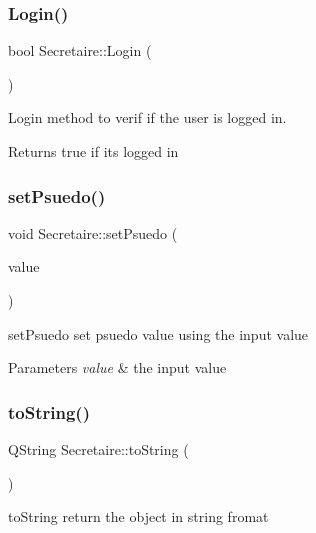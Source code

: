 \subsubsection{\texorpdfstring{Login()}{Login()}}
{\footnotesize\ttfamily bool Secretaire\+::\+Login (\begin{DoxyParamCaption}{ }\end{DoxyParamCaption})}



Login method to verif if the user is logged in. 

\begin{DoxyReturn}{Returns}
true if it\textquotesingle{}s logged in 
\end{DoxyReturn}
\mbox{\label{class_secretaire_aa43fc10abbaa9741fd4c98fcdd6e0ae6}} 
\subsubsection{\texorpdfstring{setPsuedo()}{setPsuedo()}}
{\footnotesize\ttfamily void Secretaire\+::set\+Psuedo (\begin{DoxyParamCaption}\item[{const Q\+String \&}]{value }\end{DoxyParamCaption})}



set\+Psuedo set psuedo value using the input value 


\begin{DoxyParams}{Parameters}
{\em value} & the input value \\
\hline
\end{DoxyParams}
\mbox{\label{class_secretaire_aa7abbd05fc4b70e69f2c9d748f3e7b2a}} 
\subsubsection{\texorpdfstring{toString()}{toString()}}
{\footnotesize\ttfamily Q\+String Secretaire\+::to\+String (\begin{DoxyParamCaption}{ }\end{DoxyParamCaption})}



to\+String return the object in string fromat 

